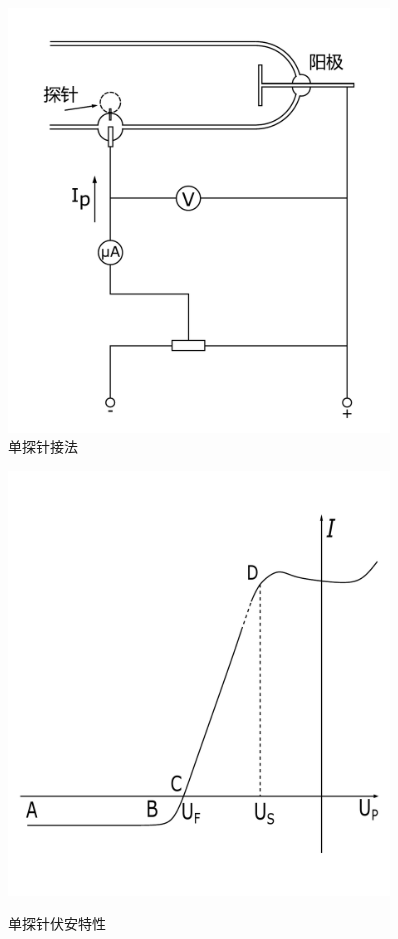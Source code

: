 \documentclass[a4paper]{article}
\begin{document}
\begin{figure}[!h]
\begin{minipage}{0.48\textwidth}
\begin{center}
\includegraphics[width=0.9\textwidth]{fig/fig2.pdf}\\
\caption{单探针接法}\label{fig2}
\end{center}
\end{minipage}
\begin{minipage}{0.48\textwidth}
\begin{center}
\includegraphics[width=0.9\textwidth]{fig/fig3.pdf}\\
\caption{单探针伏安特性}\label{fig3}
\end{center}
\end{minipage}
\end{figure}
\end{document}
